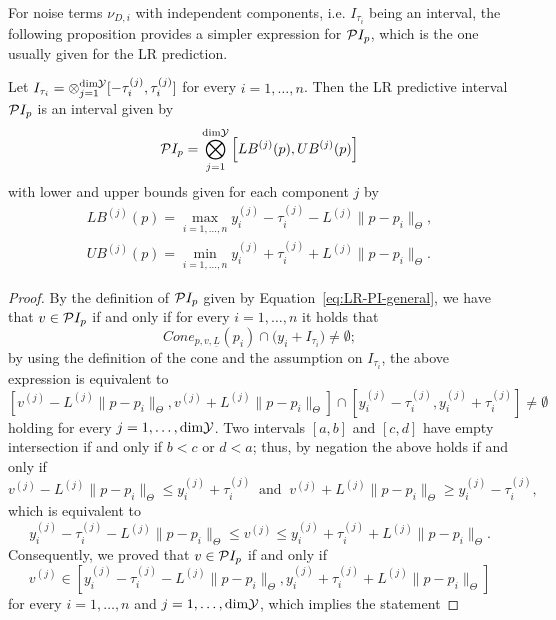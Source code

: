For noise terms $\nu_{D,i}$ with independent components, i.e. $I_{\tau_i}$ being an interval, the following proposition provides a simpler expression for $\mathcal PI_p$, which is the one usually given for the LR prediction.
\begin{prp}\label{prp:LR-PI}
    Let $I_{\tau_i} = \otimes_{j=1}^{\text{dim}\mathcal Y} [ -\tau_i^{(j)}, \tau_i^{(j)} ]$ for every $i = 1, \dots, n$.
    Then the LR predictive interval $\mathcal PI_p$ is an interval given by
    \begin{equation}\label{eq:LR-PI}
        \mathcal PI_p = \bigotimes_{j=1}^{\text{dim}\mathcal Y} \left[ LB^{(j)}(p), UB^{(j)}(p)\right]
    \end{equation}
    with lower and upper bounds given for each component $j$ by
    \begin{equation} \label{eq:LR-bounds}
    \begin{gathered}
        LB^{(j)}(p) = \max_{i=1,\dots,n} y_i^{(j)} - \tau_i^{(j)} - L^{(j)} \| p - p_i \|_\Theta, \\
        UB^{(j)}(p) = \min_{i=1,\dots,n} y_i^{(j)} + \tau_i^{(j)} + L^{(j)} \| p - p_i \|_\Theta.
    \end{gathered}
    \end{equation}
\end{prp}
\begin{proof}
    By the definition of $\mathcal PI_p$ given by Equation~\eqref{eq:LR-PI-general}, we have that $v\in \mathcal PI_p$ if and only if for every $i = 1, \dots, n$ it holds that
    \[
    Cone_{p,v,\underline L}(p_i) \cap  \big ( y_i + I_{\tau_i} \big ) \neq \emptyset;
    \]
    by using the definition of the cone and the assumption on $I_{\tau_i}$, the above expression is equivalent to 
    \[
        \left[ v^{(j)} - L^{(j)} \|p-p_i\|_\Theta, v^{(j)} + L^{(j)} \|p-p_i\|_\Theta \right] \cap  \left[ y_i^{(j)} - \tau_i^{(j)}, y_i^{(j)} + \tau_i^{(j)} \right] \neq \emptyset
    \]
    holding for every $j = 1, \dots, \text{dim} \mathcal Y$. \newline
    Two intervals $[a,b]$ and $[c,d]$ have empty intersection if and only if $b < c$ or $d < a$; thus, by negation the above holds if and only if
    \[
        v^{(j)} - L^{(j)} \|p-p_i\|_\Theta \leq y_i^{(j)} + \tau_i^{(j)} \ \text{ and } \ v^{(j)} + L^{(j)} \|p-p_i\|_\Theta \geq y_i^{(j)} - \tau_i^{(j)},
    \] which is equivalent to 
    \[
        y_i^{(j)} - \tau_i^{(j)} - L^{(j)} \|p-p_i\|_\Theta \leq v^{(j)} \leq y_i^{(j)} + \tau_i^{(j)} + L^{(j)} \|p-p_i\|_\Theta.
    \]
    Consequently, we proved that $v \in \mathcal PI_p$ if and only if
    \[
        v^{(j)} \in \left[ y_i^{(j)} - \tau_i^{(j)} - L^{(j)} \|p-p_i\|_\Theta, y_i^{(j)} + \tau_i^{(j)} + L^{(j)} \|p-p_i\|_\Theta \right]
    \]
    for every $i = 1, \dots, n$ and $j = 1, \dots, \text{dim} \mathcal Y$, which implies the statement
\end{proof}

